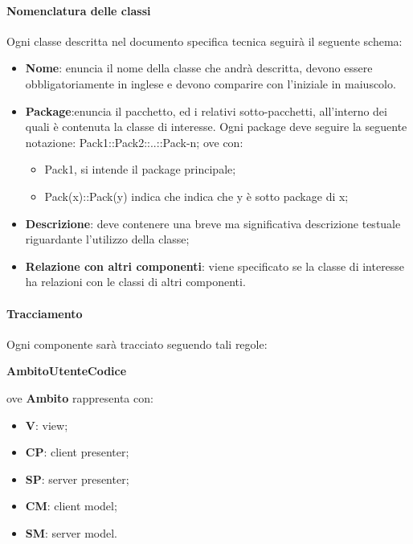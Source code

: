 \paragraph{Nomenclatura delle classi}
Ogni classe descritta nel documento specifica tecnica seguirà il seguente schema:
\begin{itemize}
\item \textbf{Nome}: enuncia il nome della classe che andrà descritta, devono essere obbligatoriamente in inglese e devono comparire con l'iniziale in maiuscolo.
\item \textbf{Package}:enuncia il pacchetto, ed i relativi sotto-pacchetti, all'interno dei quali è contenuta la classe di interesse.
Ogni package deve seguire la seguente notazione: Pack1::Pack2::..::Pack-n;
ove con:
\begin{itemize}
\item Pack1, si intende il package principale;
\item Pack(x)::Pack(y) indica che indica che y è sotto package di x;
\end{itemize}

\item \textbf{Descrizione}: deve contenere una breve ma significativa descrizione testuale riguardante l'utilizzo della classe;
\item \textbf{Relazione con altri componenti}: viene specificato se la classe di interesse ha relazioni con le classi di altri componenti.
\end{itemize}

\paragraph{Tracciamento}
Ogni componente sarà tracciato seguendo tali regole:\\
\begin{center}
{\textbf{Ambito}}{\textbf{Utente}}{\textbf{Codice}}
\end{center}

ove \textbf{Ambito} rappresenta con:
\begin{itemize}
\item \textbf{V}: view;
\item \textbf{CP}: client presenter;
\item \textbf{SP}: server presenter;
\item \textbf{CM}: client model;
\item \textbf{SM}: server model.
\end{itemize}

